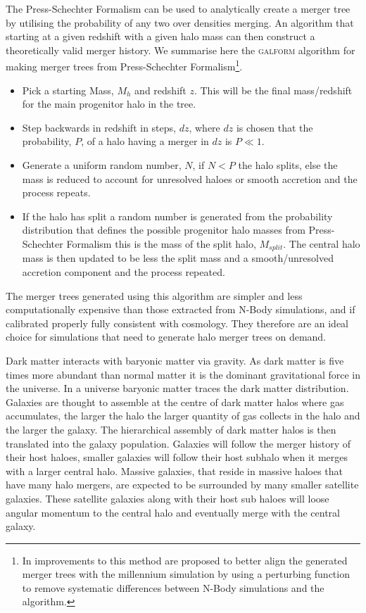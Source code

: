 The Press-Schechter Formalism can be used to analytically create a merger tree by utilising the probability of any two over densities merging. An algorithm that starting at a given redshift with a given halo mass can then construct a theoretically valid merger history. We summarise here the \textsc{galform} \citep{Cole2000} algorithm for making merger trees from Press-Schechter Formalism\footnote{In \citet{Parkinson2008GeneratingTrees} improvements to this method are proposed to better align the generated merger trees with the millennium simulation by using a perturbing function to remove systematic differences between N-Body simulations and the algorithm.}.

\begin{itemize}
    \item Pick a starting Mass, $M_{h}$ and redshift $z$. This will be the final mass/redshift for the main progenitor halo in the tree.
    \item Step backwards in redshift in steps, $dz$, where $dz$ is chosen that the probability, $P$, of a halo having a merger in $dz$ is $P\ll1$.
    \item Generate a uniform random number, $N$, if $N<P$ the halo splits, else the mass is reduced to account for unresolved haloes or smooth accretion and the process repeats.
    \item If the halo has split a random number is generated from the probability distribution that defines the possible progenitor halo masses from  Press-Schechter Formalism this is the mass of the split halo, $M_{split}$. The central halo mass is then updated to be less the split mass and a smooth/unresolved accretion component and the process repeated.
\end{itemize}

The merger trees generated using this algorithm are simpler and less computationally expensive than those extracted from N-Body simulations, and if calibrated properly fully consistent with \LCDM cosmology. They therefore are an ideal choice for simulations that need to generate halo merger trees on demand.

Dark matter interacts with baryonic matter via gravity. As dark matter is five times more abundant than normal matter it is the dominant gravitational force in the universe. In a \LCDM universe baryonic matter traces the dark matter distribution. Galaxies are thought to assemble at the centre of dark matter halos where gas accumulates, the larger the halo the larger quantity of gas collects in the halo and the larger the galaxy. The hierarchical assembly of dark matter halos is then translated into the galaxy population. Galaxies will follow the merger history of their host haloes, smaller galaxies will follow their host subhalo when it merges with a larger central halo. Massive galaxies, that reside in massive haloes that have many halo mergers, are expected to be surrounded by many smaller satellite galaxies. These satellite galaxies along with their host sub haloes will loose angular momentum to the central halo and eventually merge with the central galaxy.

